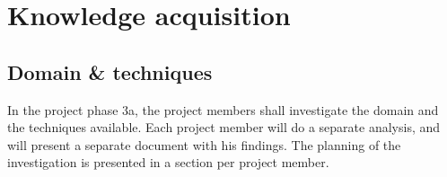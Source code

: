 
\section{Knowledge acquisition}
\label{sec:knowledge-acquisition}

\subsection{Domain \& techniques}
%
In the project phase 3a, the project members shall investigate the domain and the techniques available.
Each project member will do a separate analysis, and will present a separate document with his findings.
The planning of the investigation is presented in a section per project member.

